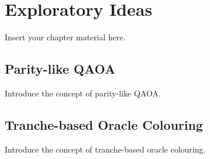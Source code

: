 
\chapter{Exploratory Ideas}
\label{chapter:Exploratory_Ideas}

Insert your chapter material here.

\section{Parity-like QAOA}
\label{section:Parity_QAOA}

Introduce the concept of parity-like QAOA.

\section{Tranche-based Oracle Colouring}
\label{section:Oracle_Colouring}

Introduce the concept of tranche-based oracle colouring.